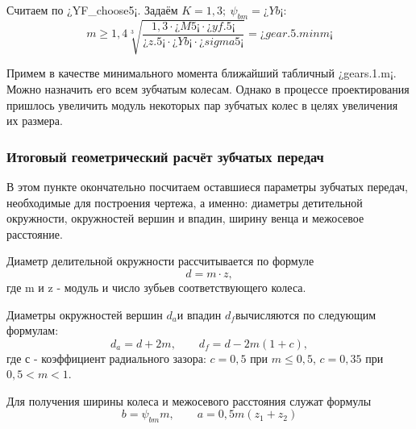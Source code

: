 \documentclass[14pt,a4paper,russian]{scrartcl}
\begin{document}
        Считаем по ¿YF_choose5¡. Задаём \( K=1,3;\ \psi_{bm}=¿Yb¡ \):
        \[ m \geq 1,4\sqrt[3]{\frac{1,3\cdot ¿M5¡\cdot ¿yf.5¡}{¿z.5¡\cdot ¿Yb¡\cdot ¿sigma5¡}}=¿gear.5.minm¡ \]
        
        Примем в качестве минимального момента ближайший табличный ¿gears.1.m¡. Можно назначить его
        всем зубчатым колесам. Однако в процессе проектирования пришлось увеличить модуль некоторых
        пар зубчатых колес в целях увеличения их размера.

    
    \subsubsection{Итоговый геометрический расчёт зубчатых передач}
        В этом пункте окончательно посчитаем оставшиеся параметры зубчатых передач,
        необходимые для построения чертежа, а именно: диаметры детительной окружности, окружностей вершин
        и впадин, ширину венца и межосевое расстояние.\par

        Диаметр делительной окружности рассчитывается по формуле
        \[ d = m\cdot z, \]
        где m и z - модуль и число зубьев соответствующего колеса.\par

        Диаметры окружностей вершин \( d_a \)и впадин \( d_f \)вычисляются по следующим формулам:
        \[ d_a = d + 2m,\qquad d_f = d - 2m(1+c),\]
        где с - коэффициент радиального зазора: 
            \( c=0,5 \) при \( m\leq 0,5 \), \( c=0,35 \) при \( 0,5<m<1 \).
        
        Для получения ширины колеса и межосевого расстояния служат формулы
        \[ b=\psi_{bm}m, \qquad  a = 0,5m(z_1+z_2)\]
        
\end{document}
